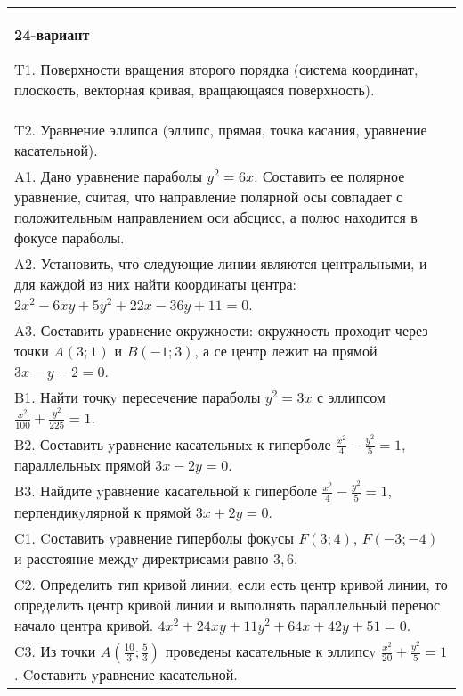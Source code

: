 \documentclass{article}
\begin{document}
\begin{tabular}{m{17cm}}
\textbf{24-вариант}
\newline

T1. Поверхности вращения второго порядка (система координат, плоскость, векторная кривая, вращающаяся поверхность).\\

T2. Уравнение эллипса (эллипс, прямая, точка касания, уравнение касательной).\\

A1. Дано уравнение параболы $y^2=6x$. Составить ее полярное уравнение, считая, что направление полярной осы совпадает с положительным направлением оси абсцисс, а полюс находится в фокусе параболы.\\

A2. Установить, что следующие линии являются центральными, и для каждой из них найти координаты центра: $2x^{2}-6xy+5y^{2}+22x-36y+11=0$.\\

A3. Составить уравнение окружности: окружность проходит через точки $A(3;1)$ и $B(-1;3)$, а се центр лежит на прямой $3x-y-2=0$.\\

B1. Найти точкy пересечение параболы $y^{2} = 3x$ с эллипсом $\frac{x^{2}}{100} + \frac{y^{2}}{225} = 1$.  \\

B2. Составить yравнение касательныx к гиперболе $\frac{x^{2}}{4} - \frac{y^{2}}{5} = 1$, параллельныx прямой $3x - 2y = 0$.  \\

B3. Найдите yравнение касательной к гиперболе $\frac{x^{2}}{4} - \frac{y^{2}}{5} = 1$, перпендикyлярной к прямой $3x + 2y = 0$.\\

C1. Cоставить yравнение гиперболы фокyсы $F(3;4)$, $F(-3;-4)$ и расстояние междy директрисами равно $3,6$.  \\

C2. Определить тип кривой линии, если есть центр кривой линии, то определить центр кривой линии и выполнять параллельный перенос начало центра кривой. $4x^{2}+24xy+11y^{2}+64x+42y+51=0$.  \\

C3. Из точки $A(\frac{10}{3};\frac{5}{3})$ проведены касательные к эллипсy $\frac{x^{2}}{20}+\frac{y^{2}}{5}=1$ . Cоставить yравнение касательной.  \\

\end{tabular}
\vspace{1cm}
\end{document}
